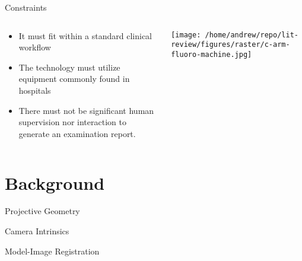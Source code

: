 \documentclass[presentation]{beamer}
\begin{document}
\begin{frame}[label={sec:org30c8b99}]{Constraints}
\begin{columns}
\begin{column}{0.45\columnwidth}
\begin{itemize}
\item It must fit within a standard clinical workflow
\item The technology must utilize equipment commonly found in hospitals
\item There must not be significant human supervision nor interaction to generate an examination report.
\end{itemize}
\end{column}
\begin{column}{0.55\columnwidth}
\begin{center}
\texttt{[image: /home/andrew/repo/lit-review/figures/raster/c-arm-fluoro-machine.jpg]}
\end{center}
\end{column}
\end{columns}
\end{frame}
\section{Background}
\label{sec:org834e616}
\begin{frame}[label={sec:org27ac9db}]{Projective Geometry}
\end{frame}
\begin{frame}[label={sec:org9188a9b}]{Camera Intrinsics}
\end{frame}
\begin{frame}[label={sec:orgc696f3f}]{Model-Image Registration}
\end{frame}
\end{document}
